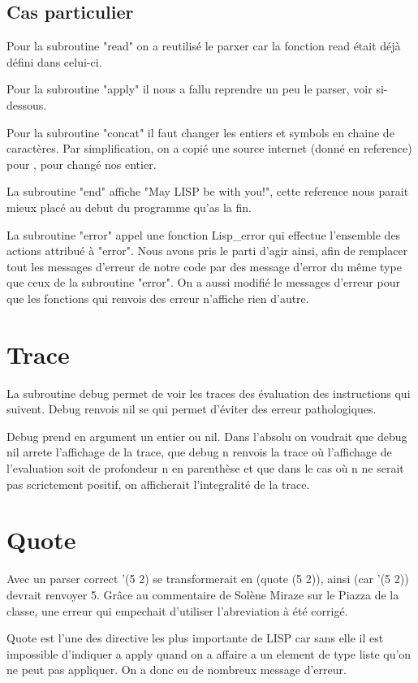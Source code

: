 \documentclass[a4paper,11pt]{article}
\begin{document}
\begin{itemize}
	
\end{itemize}

\subsection{Cas particulier}
	Pour la subroutine "read" on a reutilisé le parxer car la fonction read était déjà défini dans celui-ci.
	
	Pour la subroutine "apply" il nous a fallu reprendre un peu le parser, voir si-dessous.

	Pour la subroutine "concat" il faut changer les entiers et symbols en chaine de caractères. Par simplification, on a copié une source internet (donné en reference) pour , pour changé nos entier.
	
	La subroutine "end" affiche "May LISP be with you!", cette reference nous parait mieux placé au debut du programme qu'as la fin.

	La subroutine "error" appel une fonction Lisp\_error qui effectue l'ensemble des actions attribué à "error". Nous avons pris le parti d'agir ainsi, afin de remplacer tout les messages d'erreur de notre code par des message d'error du même type que ceux de la subroutine "error". On a aussi modifié le messages d'erreur pour que les fonctions qui renvois des erreur n'affiche rien d'autre.

\section{Trace}
	La subroutine debug permet de voir les traces des évaluation des instructions qui suivent. Debug renvois nil se qui permet d'éviter des erreur pathologiques.
	
	Debug prend en argument un entier ou nil. Dans l'absolu on voudrait que debug nil arrete l'affichage de la trace, que debug n renvois la trace où l'affichage de l'evaluation soit de profondeur n en parenthèse et que dans le cas où n ne serait pas scrictement positif, on afficherait l'integralité de la trace.
	
\section{Quote}
	Avec un parser correct '(5 2) se transformerait en (quote (5 2)), ainsi (car '(5 2)) devrait renvoyer 5.	Grâce au commentaire de Solène Miraze sur le Piazza de la classe, une erreur qui empechait d'utiliser l'abreviation à été corrigé. 
	
	Quote est l'une des directive les plus importante de LISP car sans elle il est impossible d'indiquer a apply quand on a affaire a un element de type liste qu'on ne peut pas appliquer. On a donc eu de nombreux message d'erreur.
	
\end{document}
